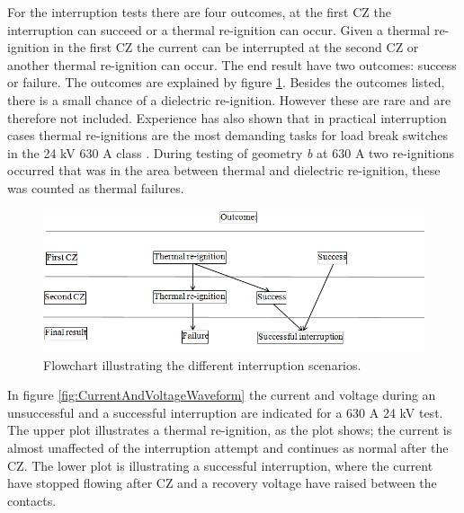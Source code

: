 \documentclass[10pt,a4paper,twoside]{article}
\begin{document}
For the interruption tests there are four outcomes, at the first CZ the interruption can succeed or a thermal re-ignition can occur. Given a thermal re-ignition in the first CZ the current can be interrupted at the second CZ or another thermal re-ignition can occur. The end result have two outcomes: success or failure. The outcomes are explained by figure \ref{fig:pilSuccessOfFail}. Besides the outcomes listed, there is a small chance of a dielectric re-ignition. However these are rare and are therefore not included. Experience has also shown that in practical interruption cases thermal re-ignitions are the most demanding tasks for load break switches in the 24 kV 630 A class \cite{bib:AFIMVLBA}. During testing of geometry \textit{b} at 630 A two re-ignitions occurred that was in the area between thermal and dielectric re-ignition, these was counted as thermal failures.

\begin{figure}[H]
\centering
\includegraphics[scale=0.7]{Bilder/Results/interruptionFlowChart.png}
\caption{Flowchart illustrating the different interruption scenarios.} \label{fig:pilSuccessOfFail}
\end{figure}

In figure \ref{fig:CurrentAndVoltageWaveform} the current and voltage during an unsuccessful and a successful interruption are indicated for a 630 A 24 kV test. The upper plot illustrates a thermal re-ignition, as the plot shows; the current is almost unaffected of the interruption attempt and continues as normal after the CZ. The lower plot is illustrating a successful interruption, where the current have stopped flowing after CZ and a recovery voltage have raised between the contacts.
\end{document}
